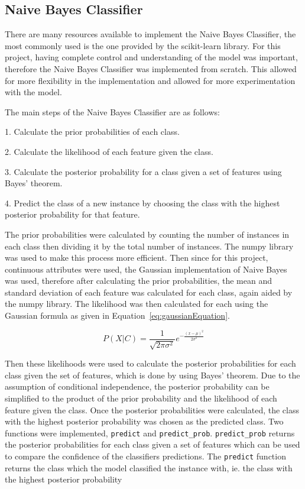 \subsection{Naive Bayes Classifier}

There are many resources available to implement the Naive Bayes Classifier, the most commonly used is the one provided by the scikit-learn library. For this project, having complete control and understanding of the model was important, therefore the Naive Bayes Classifier was implemented from scratch. This allowed for more flexibility in the implementation and allowed for more experimentation with the model. 

The main steps of the Naive Bayes Classifier are as follows:


1. Calculate the prior probabilities of each class.

2. Calculate the likelihood of each feature given the class.

3. Calculate the posterior probability for a class given a set of features using Bayes' theorem.

4. Predict the class of a new instance by choosing the class with the highest posterior probability for that feature.

The prior probabilities were calculated by counting the number of instances in each class then dividing it by the total number of instances. The numpy library was used to make this process more efficient. Then since for this project, continuous attributes were used, the Gaussian implementation of Naive Bayes was used, therefore after calculating the prior probabilities, the mean and standard deviation of each feature was calculated for each class, again aided by the numpy library.  The likelihood was then calculated for each using the Gaussian formula as given in Equation~\ref{eq:gaussianEquation}.


\begin{equation}
    \label{eq:gaussianEquation}
    P(X | C) = \frac{1}{\sqrt{2\pi\sigma^2}} e^{-\frac{(x - \mu)^2}{2\sigma^2}}
\end{equation}

Then these likelihoods were used to calculate the posterior probabilities for each class given the set of features, which is done by using Bayes' theorem. Due to the assumption of conditional independence, the posterior probability can be simplified to the product of the prior probability and the likelihood of each feature given the class. Once the posterior probabilities were calculated, the class with the highest posterior probability was chosen as the predicted class. Two functions were implemented, \texttt{predict} and \texttt{predict\_prob}. \texttt{predict\_prob} returns the posterior probabilities for each class given a set of features which can be used to compare the confidence of the classifiers predictions. The \texttt{predict} function returns the class which the model classified the instance with, ie. the class with the highest posterior probability

